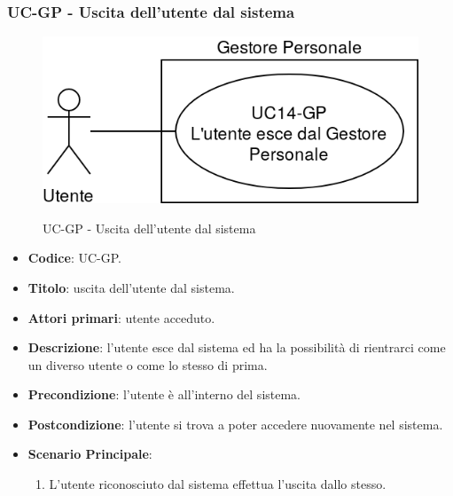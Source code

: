 \subsubsection{UC\theuccount-GP - Uscita dell'utente dal sistema}
		\begin{figure}[H]
			\centering
				\includegraphics[width=\columnwidth]{img/casi_d'uso/UC14.png}\\
			\caption{UC\theuccount-GP - Uscita dell'utente dal sistema}
		\end{figure}
	\begin{itemize}
		\item \textbf{Codice}: UC\theuccount-GP.
		\item \textbf{Titolo}: uscita dell'utente dal sistema.
		\item \textbf{Attori primari}: utente acceduto.
		\item \textbf{Descrizione}: l'utente esce dal sistema ed ha la possibilità di rientrarci come	un diverso utente o come lo stesso di prima.
		\item \textbf{Precondizione}: l'utente è all'interno del sistema.
		\item \textbf{Postcondizione}: l'utente si trova a poter accedere nuovamente nel sistema.
		\item \textbf{Scenario Principale}:
		\begin{enumerate}
			\item L'utente riconosciuto dal sistema effettua l'uscita dallo stesso.
		\end{enumerate}
	\end{itemize}